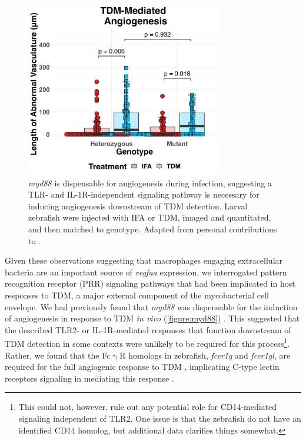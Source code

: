 \begin{figure}
\centering
\includegraphics[height=3in]{images/JB96_myd88_TDM_103022.png}
\caption{\textit{myd88} is dispensable for angiogenesis during infection, suggesting a TLR\hyp{} and IL\hyp{}1R\hyp{}independent signaling pathway is necessary for inducing angiogenesis downstream of TDM detection. Larval zebrafish were injected with IFA or TDM, imaged and quantitated, and then matched to genotype. Adapted from personal contributions to \citet{Walton2018}.}
\label{figure:myd88}

\end{figure}

Given these observations suggesting that macrophages engaging extracellular bacteria are an important source of \textit{vegfaa} expression, we interrogated pattern recognition receptor (PRR) signaling pathways that had been implicated in host responses to TDM, a major external component of the mycobacterial cell envelope. We had previously found that \textit{myd88} was dispensable for the induction of angiogenesis in response to TDM \textit{in vivo} (\autoref{figure:myd88}) \citep{Bowdish2009, Walton2018}. This suggested that the described TLR2\hyp{} or IL\hyp{}1R\hyp{}mediated responses that function downstream of TDM detection in some contexts were unlikely to be required for this process\footnote{This could not, however, rule out any potential role for CD14\hyp{}mediated signaling independent of TLR2. One issue is that the zebrafish do not have an identified CD14 homolog, but additional data clarifies things somewhat.}. Rather, we found that the Fc$\upgamma$R homologs in zebrafish, \textit{fcer1g} and \textit{fcer1gl}, are required for the full angiogenic response to TDM \citep{Walton2018}, implicating C\hyp{}type lectin receptors signaling in mediating this response \citep{Richardson2014, Zhao2014}.

